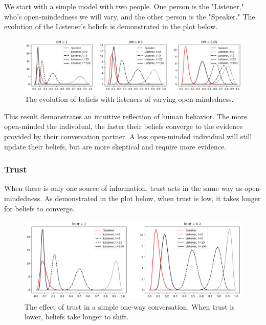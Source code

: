 \documentclass[11pt]{article}
\begin{document}
We start with a simple model with two people. One person is the "Listener," who's open-mindedness we will vary, and the other person is the "Speaker." The evolution of the Listener's beliefs is demonstrated in the plot below.

\begin{figure}[h]
    \centering
    \includegraphics[scale=0.5]{images/open_mindedness_example.png}
    \caption{The evolution of beliefs with listeners of varying open-mindedness.}
\end{figure}

This result demonstrates an intuitive reflection of human behavior. The more open-minded the individual, the faster their beliefs converge to the evidence provided by their conversation partner. A less open-minded individual will still update their beliefs, but are more skeptical and require more evidence.

\subsubsection{Trust}

When there is only one source of information, trust acts in the same way as open-mindedness. As demonstrated in the plot below, when trust is low, it takes longer for beliefs to converge.

\begin{figure}[h]
    \centering
    \includegraphics[scale=0.5]{images/trust_example.png}
    \caption{The effect of trust in a simple one-way conversation. When trust is lower, beliefs take longer to shift.}
\end{figure}

\newpage
\end{document}
